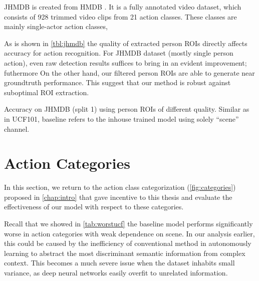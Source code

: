 JHMDB is created from HMDB \cite{Kuehne11}. It is a fully annotated video dataset, which consists of 928 trimmed video clips from 21 action classes. These classes are mainly single-actor action classes,

As is shown in \autoref{tbl:jhmdb} the quality of extracted person ROIs directly affects accuracy for action recognition.
For JHMDB dataset (mostly single person action), even raw detection results suffices to bring in an evident improvement; futhermore On the other hand, our filtered person ROIs are able to generate near groundtruth performance. This suggest that our method is robust against suboptimal ROI extraction.
\begin{table}\centering
{}
\caption{Accuracy on JHMDB (split 1) using person ROIs of different quality. Similar as in UCF101, baseline refers to the inhouse trained model using solely ``scene'' channel.} \label{tbl:jhmdb}
\end{table}

\section{Action Categories}\label{sec:categories}
In this section, we return to the action class categorization (\autoref{fig:categories}) proposed in \autoref{chap:intro} that gave incentive to this thesis and evaluate the effectiveness of our model with respect to these categories.

Recall that we showed in \autoref{tab:worstucf} the baseline model performs significantly worse in action categories with weak dependence on scene.
In our analysis earlier, this could be caused by the inefficiency of conventional method in autonomously learning to abstract the most discriminant semantic information from complex context.
This becomes a much severe issue when the dataset inhabits small variance, as deep neural networks easily overfit to unrelated information.

